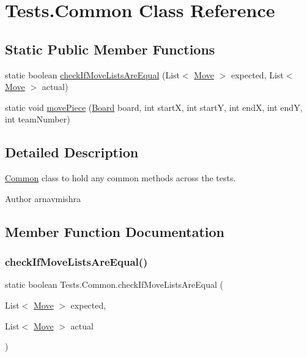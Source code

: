 \hypertarget{class_tests_1_1_common}{}\section{Tests.\+Common Class Reference}
\label{class_tests_1_1_common}
\subsection*{Static Public Member Functions}
\begin{DoxyCompactItemize}
\item 
static boolean \hyperlink{class_tests_1_1_common_a88d6dce17bfea9b706c866e0c896715d}{check\+If\+Move\+Lists\+Are\+Equal} (List$<$ \hyperlink{class_framework_1_1_move}{Move} $>$ expected, List$<$ \hyperlink{class_framework_1_1_move}{Move} $>$ actual)
\item 
static void \hyperlink{class_tests_1_1_common_a5809bd3c5d93653260370e00f74aad6a}{move\+Piece} (\hyperlink{class_framework_1_1_board}{Board} board, int startX, int startY, int endX, int endY, int team\+Number)
\end{DoxyCompactItemize}


\subsection{Detailed Description}
\hyperlink{class_tests_1_1_common}{Common} class to hold any common methods across the tests. \begin{DoxyAuthor}{Author}
arnavmishra 
\end{DoxyAuthor}


\subsection{Member Function Documentation}
\hypertarget{class_tests_1_1_common_a88d6dce17bfea9b706c866e0c896715d}{}\label{class_tests_1_1_common_a88d6dce17bfea9b706c866e0c896715d} 
\subsubsection{\texorpdfstring{check\+If\+Move\+Lists\+Are\+Equal()}{checkIfMoveListsAreEqual()}}
{\footnotesize\ttfamily static boolean Tests.\+Common.\+check\+If\+Move\+Lists\+Are\+Equal (\begin{DoxyParamCaption}\item[{List$<$ \hyperlink{class_framework_1_1_move}{Move} $>$}]{expected,  }\item[{List$<$ \hyperlink{class_framework_1_1_move}{Move} $>$}]{actual }\end{DoxyParamCaption})\hspace{0.3cm}{\ttfamily [static]}}

